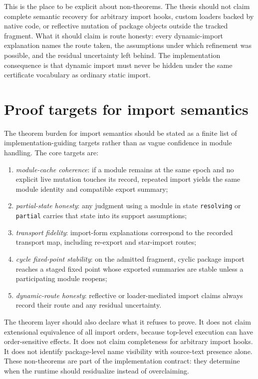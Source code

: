 \documentclass[11pt]{report}
\begin{document}
This is the place to be explicit about non-theorems. The thesis should not claim complete semantic recovery for arbitrary import hooks, custom loaders backed by native code, or reflective mutation of package objects outside the tracked fragment. What it should claim is route honesty: every dynamic-import explanation names the route taken, the assumptions under which refinement was possible, and the residual uncertainty left behind. The implementation consequence is that dynamic import must never be hidden under the same certificate vocabulary as ordinary static import.
\section{Proof targets for import semantics}
The theorem burden for import semantics should be stated as a finite list of implementation-guiding targets rather than as vague confidence in module handling. The core targets are:
\begin{enumerate}
\item \emph{module-cache coherence}: if a module remains at the same epoch and no explicit live mutation touches its record, repeated import yields the same module identity and compatible export summary;
\item \emph{partial-state honesty}: any judgment using a module in state \texttt{resolving} or \texttt{partial} carries that state into its support assumptions;
\item \emph{transport fidelity}: import-form explanations correspond to the recorded transport map, including re-export and star-import routes;
\item \emph{cycle fixed-point stability}: on the admitted fragment, cyclic package import reaches a staged fixed point whose exported summaries are stable unless a participating module reopens;
\item \emph{dynamic-route honesty}: reflective or loader-mediated import claims always record their route and any residual uncertainty.
\end{enumerate}

The theorem layer should also declare what it refuses to prove. It does not claim extensional equivalence of all import orders, because top-level execution can have order-sensitive effects. It does not claim completeness for arbitrary import hooks. It does not identify package-level name visibility with source-text presence alone. These non-theorems are part of the implementation contract: they determine when the runtime should residualize instead of overclaiming.
\end{document}
